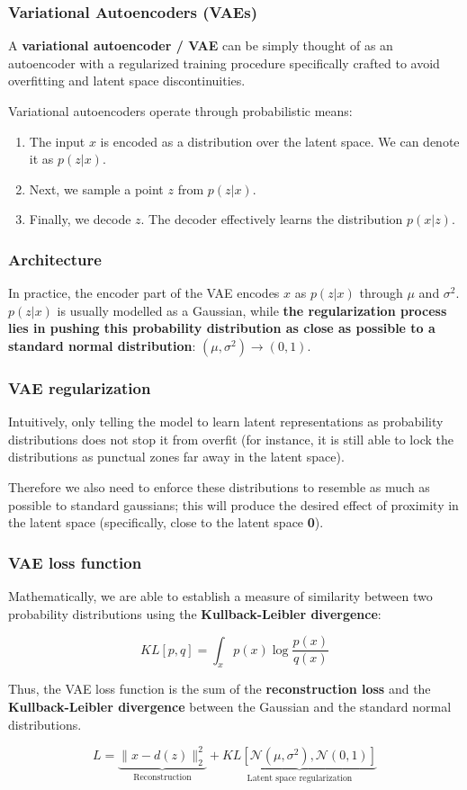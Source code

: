 \begin{frame}
    \frametitle{Variational Autoencoders (VAEs)}
    A \textbf{variational autoencoder / VAE} can be simply thought of as an autoencoder with a regularized training procedure specifically crafted to avoid overfitting and latent space discontinuities.

    Variational autoencoders operate through probabilistic means:
    \begin{enumerate}
        \item The input $x$ is encoded as a distribution over the latent space. We can denote it as $p(z|x)$.
        \item Next, we sample a point $z$ from $p(z|x)$.
        \item Finally, we decode $z$. The decoder effectively learns the distribution $p(x|z)$.
    \end{enumerate}
\end{frame}

\begin{frame}
    \frametitle{Architecture}
    In practice, the encoder part of the VAE encodes $x$ as $p(z|x)$ through $\mu$ and $\sigma^2$. $p(z|x)$ is usually modelled as a Gaussian, while \textbf{the regularization process lies in pushing this probability distribution as close as possible to a standard normal distribution}: $(\mu, \sigma^2) \to (0, 1)$.
\end{frame}

\begin{frame}
    \frametitle{VAE regularization}
    Intuitively, only telling the model to learn latent representations as probability distributions does not stop it from overfit (for instance, it is still able to lock the distributions as punctual zones far away in the latent space).

    Therefore we also need to enforce these distributions to resemble as much as possible to standard gaussians; this will produce the desired effect of proximity in the latent space (specifically, close to the latent space \textbf{0}).
\end{frame}

\begin{frame}
    \frametitle{VAE loss function}
    Mathematically, we are able to establish a measure of similarity between two probability distributions using the \textbf{Kullback-Leibler divergence}:

    $$KL[p,q] = \int_x p(x) \log{\frac{p(x)}{q(x)}}$$

    Thus, the VAE loss function is the sum of the \textbf{reconstruction loss} and the \textbf{Kullback-Leibler divergence} between the Gaussian and the standard normal distributions.

    $$L = \underbrace{\lVert x - d(z)\rVert_2^2}_{\text{Reconstruction}} + \underbrace{KL\left[\mathcal N(\mu, \sigma^2), \mathcal N(0,1)\right]}_{\text{Latent space regularization}}$$
\end{frame}

